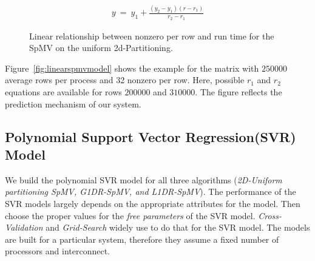 \documentclass[conference, 10ppt]{IEEEtran}
\begin{document}
\begin{equation*}
\begin{array}{l}
y\ =\ y_1+\frac{(y_2-y_1) (r-r_1)}{r_2-r_1}
\end{array}
\end{equation*}
\begin{figure}[hbt!]
\centering
{}
\caption{Linear relationship between nonzero per row and run time for the SpMV on the uniform 2d-Partitioning.}
\label{fig:ov-linear-model}
\end{figure}
Figure~\ref{fig:linearspmvmodel} shows the example for the matrix with $250000$ average rows per process and 32 nonzero per row. 
Here, possible $r_1$ and $r_2$ equations are available for rows $200000$ and $310000$. The figure reflects the prediction mechanism of our 
system. 


\subsection{Polynomial Support Vector Regression(SVR) Model}
\label{sec:svr-spmv}
We build the polynomial SVR model for all three algorithms
(\textit{2D-Uniform partitioning SpMV, G1DR-SpMV, and L1DR-SpMV}). The
performance of the SVR models largely depends on the appropriate
attributes for the model. Then choose the proper values for the
\textit{free parameters} of the SVR model.  \textit{Cross-Validation}
and \textit{Grid-Search} widely use to do that for the SVR model. The
models are built for a particular system, therefore they assume a
fixed number of processors and interconnect.
\end{document}
